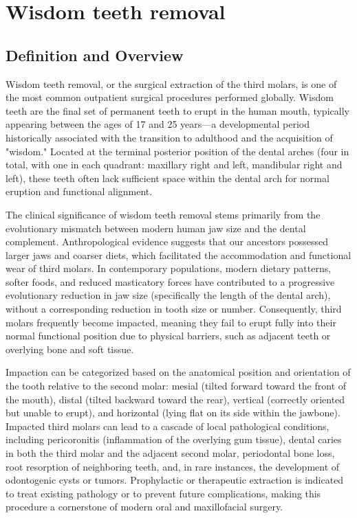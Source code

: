 \chapter{Wisdom teeth removal}

\section*{Definition and Overview}
Wisdom teeth removal, or the surgical extraction of the third molars, is one of the most common outpatient surgical procedures performed globally. Wisdom teeth are the final set of permanent teeth to erupt in the human mouth, typically appearing between the ages of 17 and 25 years---a developmental period historically associated with the transition to adulthood and the acquisition of "wisdom." Located at the terminal posterior position of the dental arches (four in total, with one in each quadrant: maxillary right and left, mandibular right and left), these teeth often lack sufficient space within the dental arch for normal eruption and functional alignment.

The clinical significance of wisdom teeth removal stems primarily from the evolutionary mismatch between modern human jaw size and the dental complement. Anthropological evidence suggests that our ancestors possessed larger jaws and coarser diets, which facilitated the accommodation and functional wear of third molars. In contemporary populations, modern dietary patterns, softer foods, and reduced masticatory forces have contributed to a progressive evolutionary reduction in jaw size (specifically the length of the dental arch), without a corresponding reduction in tooth size or number. Consequently, third molars frequently become impacted, meaning they fail to erupt fully into their normal functional position due to physical barriers, such as adjacent teeth or overlying bone and soft tissue.

Impaction can be categorized based on the anatomical position and orientation of the tooth relative to the second molar: mesial (tilted forward toward the front of the mouth), distal (tilted backward toward the rear), vertical (correctly oriented but unable to erupt), and horizontal (lying flat on its side within the jawbone). Impacted third molars can lead to a cascade of local pathological conditions, including pericoronitis (inflammation of the overlying gum tissue), dental caries in both the third molar and the adjacent second molar, periodontal bone loss, root resorption of neighboring teeth, and, in rare instances, the development of odontogenic cysts or tumors. Prophylactic or therapeutic extraction is indicated to treat existing pathology or to prevent future complications, making this procedure a cornerstone of modern oral and maxillofacial surgery.

